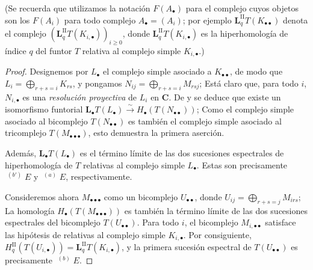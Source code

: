\documentclass[10pt,oneside,openany]{book}
\theoremstyle{egaenv}\newtheorem*{env}{---}
\theoremstyle{egastatement}
\theoremstyle{egadescription}
\renewcommand{\geq}{\geqslant}
\begin{document}
(Se recuerda que utilizamos la notación $F(A_\bullet)$ para el complejo cuyos objetos son los $F(A_i)$ para todo complejo $A_\bullet=(A_i)$; por ejemplo $\mathbf{L}_q^{\mathrm{II}}T(K_{\bullet\bullet})$ denota el complejo
$(\mathbf{L}_q^{\mathrm{II}}T(K_{i,\bullet}))_{i\geq0}$,
donde $\mathbf{L}_q^{\mathrm{II}}T(K_{i,\bullet})$ es la hiperhomología de índice
$q$ del funtor $T$ relativa al complejo simple $K_{i,\bullet}$.)

\begin{proof}
Designemos por $L_\bullet$ el complejo simple asociado a
$K_{\bullet\bullet}$, de modo que
$L_i=\bigoplus_{r+s=i}K_{rs}$,
y pongamos
$N_{ij}=\bigoplus_{r+s=i}M_{rsj}$;
Está claro que, para todo $i$, $N_{i,\bullet}$ es una \emph{resolución proyectiva}
de $L_i$ en $\boldsymbol{C}$.
De  y  se deduce que existe un
isomorfismo funtorial
$
\mathbf{L}_\bullet T(L_\bullet)\xrightarrow{\sim} H_\bullet(T(N_{\bullet\bullet}))$;
Como el complejo simple asociado al bicomplejo
$T(N_{\bullet\bullet})$ es también el complejo simple asociado al
tricomplejo $T(M_{\bullet\bullet\bullet})$, esto demuestra la primera aserción.

Además, $\mathbf{L}_\bullet T(L_\bullet)$ es el término límite de las dos
sucesiones espectrales de hiperhomología  de $T$ relativas al
complejo simple $L_\bullet$.
Estas son precisamente $\mathop{}^{(b')}E$ y $\mathop{}^{(a)}E$,
respectivamente.

Consideremos ahora $M_{\bullet\bullet\bullet}$ como un bicomplejo
$U_{\bullet\bullet}$, donde
$U_{ij}=\bigoplus_{r+s=j}M_{irs}$;
La homología $H_\bullet(T(M_{\bullet\bullet\bullet}))$ es también la
término límite de las dos sucesiones espectrales del bicomplejo
$T(U_{\bullet\bullet})$.
Para todo $i$, el bicomplejo $M_{i,\bullet\bullet}$ satisface las
hipótesis de  relativas al complejo simple
$K_{i,\bullet}$.
Por consiguiente,
$H_q^{\mathrm{II}}(T(U_{i,\bullet}))=
\mathbf{L}_q^{\mathrm{II}}T(K_{i,\bullet})$,
y la primera sucesión espectral de $T(U_{\bullet\bullet})$ es precisamente
$\mathop{}^{(b)}E$.


\end{proof}
\end{document}
